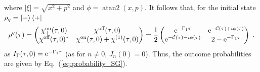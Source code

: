 \documentclass[%
reprint,
superscriptaddress,
nofootinbib,
 amsmath,amssymb,
prx,
floatfix,
]{revtex4-2}
\begin{document}
where  $ |\xi| =\sqrt{x^2 + p^2}$ and $\phi =\operatorname{atan2}(x,p) $. It follows that, for the initial state $\rho_q = \ket{+} \bra{+}$ \begin{equation}
    \rho^q(\tau)= \begin{pmatrix}
        \chi^{\text{on}}_+  (\tau, 0)  & \chi^{\text{off}} (\tau, 0) \\
        \chi^{\text{off}} (\tau, 0)^*  & \chi^{\text{on}}_-  (\tau, 0)  + \chi^{(1) } (\tau, 0) 
    \end{pmatrix} = \frac{1}{2} \begin{pmatrix}
        {\rm e}^{-\Gamma_1 \tau} &  {\rm e}^{ - \mathcal{C} (\tau) + i  \phi (\tau) } \\
        {\rm e}^{ - \mathcal{C} (\tau) - i  \phi(\tau)}   & 2 - {\rm e}^{-\Gamma_1 \tau} \\ 
    \end{pmatrix} \;.
\end{equation}
as $I_\Gamma (\tau, 0 )  = {\rm e}^{-\Gamma_1 \tau}$ (as for $n\neq 0$, $J_n(0) = 0 $). Thus, the outcome probabilities are given by Eq.~(\ref{eq:probability_SG}).
\end{document}
